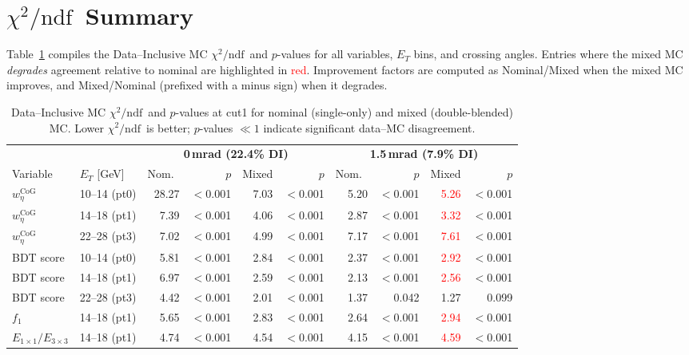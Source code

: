 \documentclass[11pt,a4paper]{article}
\newcommand{\wetacog}{\texorpdfstring{$w_{\eta}^{\mathrm{CoG}}$}{w\_eta\textasciicircum CoG}}
\newcommand{\chidf}{\texorpdfstring{$\chi^2/\mathrm{ndf}$}{chi2/ndf}}
\begin{document}
\section{\chidf\ Summary}
\label{sec:chi2table}

Table~\ref{tab:chi2} compiles the Data--Inclusive MC \chidf\ and $p$-values for all
variables, $E_T$ bins, and crossing angles.  Entries where the mixed MC
\emph{degrades} agreement relative to nominal are highlighted in
\textcolor{red}{red}.  Improvement factors are computed as
Nominal/Mixed when the mixed MC improves, and Mixed/Nominal
(prefixed with a minus sign) when it degrades.

\begin{table}[H]
\centering
\caption{Data--Inclusive MC \chidf\ and $p$-values at cut1 for nominal (single-only) and mixed
  (double-blended) MC.  Lower \chidf\ is better; $p$-values $\ll 1$ indicate significant
  data--MC disagreement.}
\label{tab:chi2}
\footnotesize
\begin{tabular}{ll rrrr rrrr}
\toprule
 & & \multicolumn{4}{c}{\textbf{0\,mrad (22.4\% DI)}}
   & \multicolumn{4}{c}{\textbf{1.5\,mrad (7.9\% DI)}} \\
\cmidrule(lr){3-6} \cmidrule(lr){7-10}
Variable & $E_T$ [GeV]
  & Nom.\ & $p$ & Mixed & $p$
  & Nom.\ & $p$ & Mixed & $p$ \\
\midrule
\wetacog & 10--14 (pt0)
  & 28.27 & $<$0.001 &  7.03 & $<$0.001
  &  5.20 & $<$0.001 & \textcolor{red}{5.26} & $<$0.001 \\
\wetacog & 14--18 (pt1)
  &  7.39 & $<$0.001 &  4.06 & $<$0.001
  &  2.87 & $<$0.001 & \textcolor{red}{3.32} & $<$0.001 \\
\wetacog & 22--28 (pt3)
  &  7.02 & $<$0.001 &  4.99 & $<$0.001
  &  7.17 & $<$0.001 & \textcolor{red}{7.61} & $<$0.001 \\
\midrule
BDT score & 10--14 (pt0)
  &  5.81 & $<$0.001 &  2.84 & $<$0.001
  &  2.37 & $<$0.001 & \textcolor{red}{2.92} & $<$0.001 \\
BDT score & 14--18 (pt1)
  &  6.97 & $<$0.001 &  2.59 & $<$0.001
  &  2.13 & $<$0.001 & \textcolor{red}{2.56} & $<$0.001 \\
BDT score & 22--28 (pt3)
  &  4.42 & $<$0.001 &  2.01 & $<$0.001
  &  1.37 & 0.042   &  1.27 & 0.099 \\
\midrule
$f_1$ & 14--18 (pt1)
  &  5.65 & $<$0.001 &  2.83 & $<$0.001
  &  2.64 & $<$0.001 & \textcolor{red}{2.94} & $<$0.001 \\
\midrule
$E_{1\times1}/E_{3\times3}$ & 14--18 (pt1)
  &  4.74 & $<$0.001 &  4.54 & $<$0.001
  &  4.15 & $<$0.001 & \textcolor{red}{4.59} & $<$0.001 \\
\bottomrule
\end{tabular}
\end{table}
\end{document}
